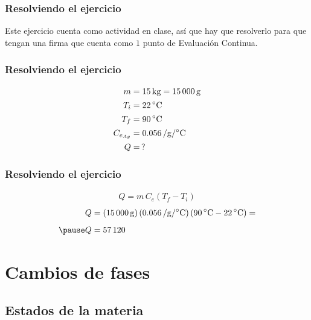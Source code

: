 \documentclass[14pt]{beamer}
\begin{document}
\begin{frame}
\frametitle{Resolviendo el ejercicio}
Este ejercicio cuenta como actividad en clase, así que hay que resolverlo para que tengan una firma que cuenta como $1$ punto de Evaluación Continua.
\end{frame}
\begin{frame}
\frametitle{Resolviendo el ejercicio}
\vspace*{-0.5cm}
\pause
\begin{align*}
m &= \SI{15}{\kilo\gram} = \SI{15000}{\gram} \\[0.15em]
T_{i} &= \SI{22}{\degreeCelsius} \\[0.15em]
T_{f} &= \SI{90}{\degreeCelsius} \\[0.15em]
C_{e_{Ag}} &= \SI{0.056}{\cal\per\gram\per\degreeCelsius} \\[0.15em]
Q &= \, ? 
\end{align*}
\end{frame}
\begin{frame}
\frametitle{Resolviendo el ejercicio}
\pause
\begin{align*}
Q = m \, C_{e} (T_{f} - T_{i})
\end{align*}
\pause
\begin{eqnarray*}
\begin{aligned}
Q &= \left( \SI{15000}{\gram} \right) \left( \SI[per-mode=fraction]{0.056}{\cal\per\gram\per\degreeCelsius} \right) \left( \SI{90}{\degreeCelsius} - \SI{22}{\degreeCelsius} \right) = \\[0.5em] \pause
Q &= \SI{57120}{\cal} 
\end{aligned}
\end{eqnarray*}
\end{frame}

\section{Cambios de fases}
\subsection{Estados de la materia}
\end{document}
